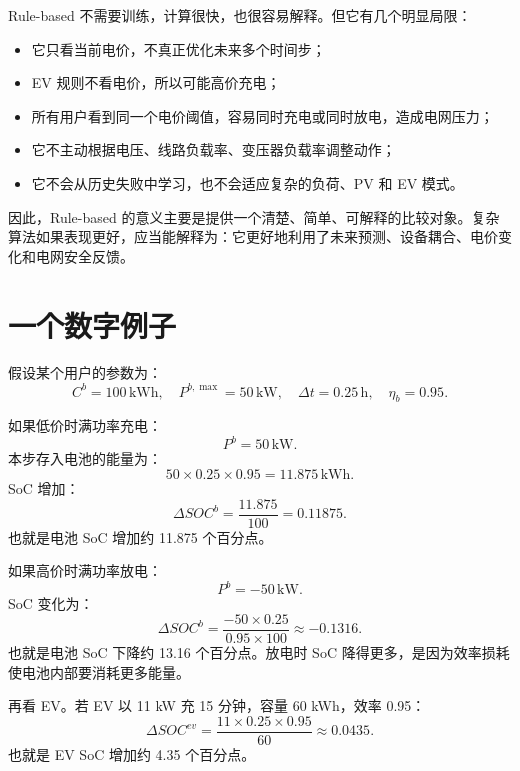 \documentclass[UTF8,zihao=-4]{ctexart}
\begin{document}
Rule-based 不需要训练，计算很快，也很容易解释。但它有几个明显局限：

\begin{itemize}
  \item 它只看当前电价，不真正优化未来多个时间步；
  \item EV 规则不看电价，所以可能高价充电；
  \item 所有用户看到同一个电价阈值，容易同时充电或同时放电，造成电网压力；
  \item 它不主动根据电压、线路负载率、变压器负载率调整动作；
  \item 它不会从历史失败中学习，也不会适应复杂的负荷、PV 和 EV 模式。
\end{itemize}

因此，Rule-based 的意义主要是提供一个清楚、简单、可解释的比较对象。复杂算法如果表现更好，应当能解释为：它更好地利用了未来预测、设备耦合、电价变化和电网安全反馈。

\section{一个数字例子}

假设某个用户的参数为：
\begin{equation}
C^b=100\,\mathrm{kWh},\quad P^{b,\max}=50\,\mathrm{kW},\quad
\Delta t=0.25\,\mathrm{h},\quad \eta_b=0.95.
\end{equation}

如果低价时满功率充电：
\begin{equation}
P^b=50\,\mathrm{kW}.
\end{equation}
本步存入电池的能量为：
\begin{equation}
50\times 0.25\times 0.95=11.875\,\mathrm{kWh}.
\end{equation}
SoC 增加：
\begin{equation}
\Delta SOC^b=\frac{11.875}{100}=0.11875.
\end{equation}
也就是电池 SoC 增加约 11.875 个百分点。

如果高价时满功率放电：
\begin{equation}
P^b=-50\,\mathrm{kW}.
\end{equation}
SoC 变化为：
\begin{equation}
\Delta SOC^b=\frac{-50\times 0.25}{0.95\times 100}
\approx -0.1316.
\end{equation}
也就是电池 SoC 下降约 13.16 个百分点。放电时 SoC 降得更多，是因为效率损耗使电池内部要消耗更多能量。

再看 EV。若 EV 以 11 kW 充 15 分钟，容量 60 kWh，效率 0.95：
\begin{equation}
\Delta SOC^{ev}
=\frac{11\times 0.25\times 0.95}{60}
\approx 0.0435.
\end{equation}
也就是 EV SoC 增加约 4.35 个百分点。
\end{document}

